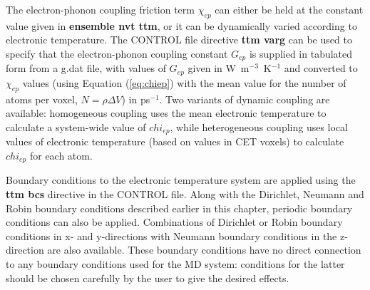 The electron-phonon coupling 
friction term $\chi_{ep}$ can either be held at 
the constant value given in {\bf ensemble nvt ttm}, or it can be dynamically 
varied according to electronic temperature. The CONTROL file directive 
{\bf ttm varg} can be used to specify that the electron-phonon coupling 
constant $G_{ep}$ is supplied in tabulated form from a g.dat file, with 
values of $G_{ep}$ given in W~m$^{-3}$~K$^{-1}$ and converted to 
$\chi_{ep}$ values (using Equation (\ref{eq:chiep}) with the mean value for 
the number of atoms per voxel, $N = \rho \Delta V$) in ps$^{-1}$. Two 
variants of dynamic coupling are available: homogeneous coupling 
uses the mean electronic temperature to calculate a system-wide value 
of $chi_{ep}$, while heterogeneous coupling uses local values of 
electronic temperature (based on values in CET voxels) to calculate 
$chi_{ep}$ for each atom.

Boundary conditions 
to the electronic temperature system are applied 
using the {\bf ttm bcs} directive in the CONTROL file. Along with the 
Dirichlet, Neumann and Robin boundary conditions described earlier in 
this chapter, periodic boundary conditions can also be applied. 
Combinations of Dirichlet or Robin boundary conditions in x- and 
y-directions with Neumann boundary conditions in the z-direction are 
also available. These boundary conditions have no direct connection to  
any boundary conditions used for the MD system: conditions for the 
latter should be chosen carefully by the user to give the desired effects.

